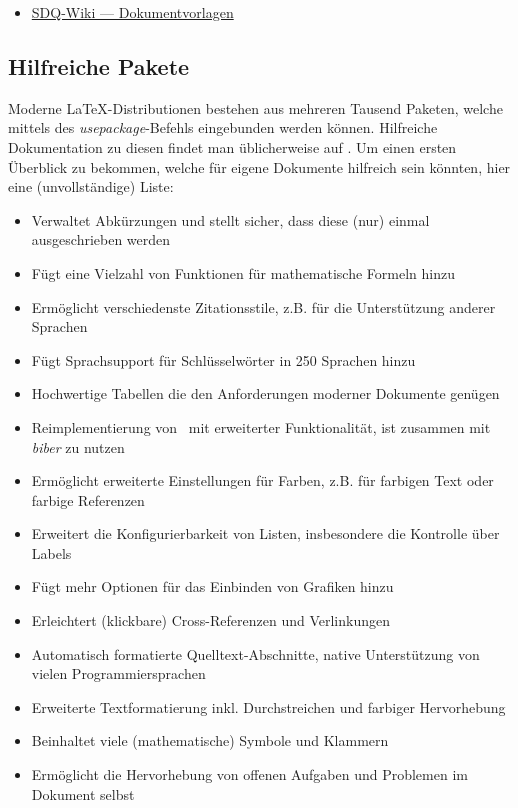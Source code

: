 \smallskip
\begin{itemize}[label={\symbolInfo}]
    \item \href{https://sdqweb.ipd.kit.edu/wiki/Dokumentvorlagen}{SDQ-Wiki --- Dokumentvorlagen}
\end{itemize}

\subsection{Hilfreiche Pakete}
\label{sec:Schreiben:Pakete}

Moderne \LaTeX-Distributionen bestehen aus mehreren Tausend Paketen, welche mittels des \emph{usepackage}-Befehls eingebunden werden können. 
Hilfreiche Dokumentation zu diesen findet man üblicherweise auf . 
Um einen ersten Überblick zu bekommen, welche für eigene Dokumente hilfreich sein könnten, hier eine (unvollständige) Liste:

\smallskip
\begin{itemize}[label={\faCube}]
    \item {} Verwaltet Abkürzungen und stellt sicher, dass diese (nur) einmal ausgeschrieben werden
    \item {} Fügt eine Vielzahl von Funktionen für mathematische Formeln hinzu
    \item {} Ermöglicht verschiedenste Zitationsstile, z.B. für die Unterstützung anderer Sprachen 
    \item {} Fügt Sprachsupport für Schlüsselwörter in 250 Sprachen hinzu
    \item {} Hochwertige Tabellen die den Anforderungen moderner Dokumente genügen
    \item {} Reimplementierung von \bibtex\ mit erweiterter Funktionalität, ist zusammen mit \emph{biber} zu nutzen
    \item {} Ermöglicht erweiterte Einstellungen für Farben, z.B. für farbigen Text oder farbige Referenzen
    \item {} Erweitert die Konfigurierbarkeit von Listen, insbesondere die Kontrolle über Labels
    \item {} Fügt mehr Optionen für das  Einbinden von Grafiken hinzu
    \item {} Erleichtert (klickbare) Cross-Referenzen und Verlinkungen 
    \item {} Automatisch formatierte Quelltext-Abschnitte, native Unterstützung von vielen Programmiersprachen
    \item {} Erweiterte Textformatierung inkl. Durchstreichen und farbiger Hervorhebung
    \item {} Beinhaltet viele (mathematische) Symbole und Klammern
    \item {} Ermöglicht die Hervorhebung von offenen Aufgaben und Problemen im Dokument selbst
\end{itemize}
\smallskip

